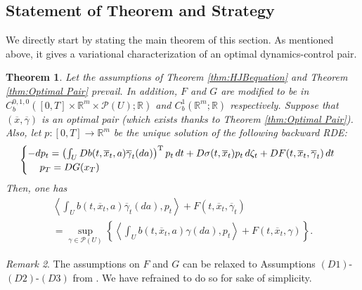 \documentclass[12pt,reqno]{amsart}
\numberwithin{equation}{section}  %
\newcommand{\1}{{\bf 1}}
\newcommand{\2}{{\bf 2}}
\newcommand{\R}{\mathbb R}
\newtheorem{theorem}{Theorem}[section]
\theoremstyle{remark}
\newtheorem{remark}[theorem]{Remark}
\theoremstyle{remark}
\begin{document}
\subsection{Statement of Theorem and Strategy}
We directly start by stating the main theorem of this section. As mentioned above, it gives a variational characterization of an optimal dynamics-control pair.
\begin{theorem}\label{Pontryagin}
			Let the assumptions of Theorem \ref{thm:HJBequation} and Theorem \ref{thm:Optimal Pair} prevail.  In addition, $F$ and $G$ are modified to be in $C_{b}^{0,1,0}([0,T]\times \R^m \times \mathcal{P}(U);\R)$ and $C_{b}^{1}(\R^m;\R)$ respectively. Suppose that $(\overline{x},\overline{\gamma})$ is an optimal pair (which exists thanks to Theorem \ref{thm:Optimal Pair}). Also, let $p\colon [0,T]\to \R^m$ be the unique solution of the following backward RDE:
	\begin{equation}\label{RDEp}
				\begin{cases}
					-dp_{t}=\left(\int_{U}Db(t,\overline{x}_{t},a)\overline{\gamma}_{t}(da)\right)^{\text{T}}p_{t}\,dt+D\sigma(t,\overline{x}_{t})p_{t}\,d\zeta_{t} +DF(t,\overline{x}_{t},\overline{\gamma}_{t})\,dt\\
					\hspace{0.43cm}p_{T}=DG(x_{T})
				\end{cases}
			\end{equation}
			Then, one has
			\begin{multline}\label{PMP}
				\left<\int_{U}b(t,\overline{x}_{t},a)\overline{\gamma}_{t}(da),p_{t} \right>+F(t,\overline{x}_{t},\overline{\gamma}_{t})\\
				=
				\sup_{\gamma \in \mathcal{P}(U)}\left\{ \left<\int_{U}b(t,\overline{x}_{t},a)\gamma(da),p_{t} \right> + F(t,\overline{x}_{t},\gamma)  \right\}.
			\end{multline}
		\end{theorem}
        \begin{remark}
            The assumptions on $F$ and $G$ can be relaxed to Assumptions $(D1)$-$(D2)$-$(D3)$ from \cite[p.~102]{yong-zhou}. We have refrained to do so for sake of simplicity.
        \end{remark}
\end{document}
